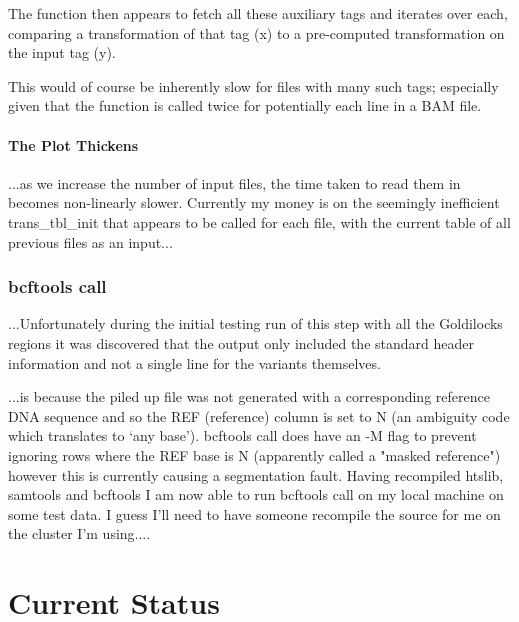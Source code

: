 The function then appears to fetch all these auxiliary tags and iterates over
each, comparing a transformation of that tag (x) to a pre-computed
transformation on the input tag (y).

This would of course be inherently slow for files with many such tags;
especially given that the function is called twice for potentially each line in
a BAM file.


\subsubsection{The Plot Thickens}

...as we increase the number of input files, the time taken to
read them in becomes non-linearly slower. Currently my money is on the seemingly
inefficient trans\_tbl\_init that appears to be called for each file, with the
current table of all previous files as an input...


\subsection{bcftools call}

...Unfortunately during the initial testing run of this step with all the
Goldilocks regions it was discovered that the output only included the standard
header information and not a single line for the variants themselves.

...is because the piled up file was not generated with a corresponding reference
DNA sequence and so the REF (reference) column is set to N (an ambiguity code
which translates to ‘any base’).  bcftools call does have an -M flag to prevent
ignoring rows where the REF base is N (apparently called a "masked reference")
however this is currently causing a segmentation fault.  Having recompiled
htslib, samtools and bcftools I am now able to run bcftools call on my local
machine on some test data. I guess I’ll need to have someone recompile the
source for me on the cluster I’m using....




\chapter{Current Status}

